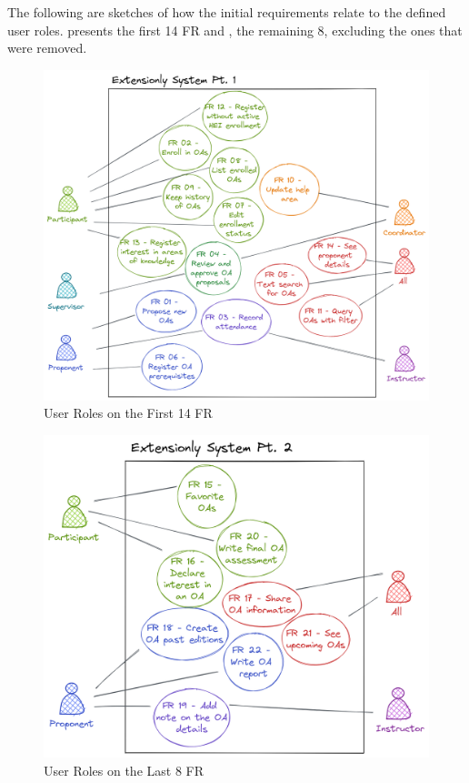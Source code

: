 

The following are sketches of how the initial requirements relate to the defined user roles.  presents the first 14 \ac{FR} and , the remaining 8, excluding the ones that were removed.

\begin{figure}[!htb]
  \caption{User Roles on the First 14 \ac{FR}}\label{fig:use-case-1}
  \begin{center}
    \includegraphics[width=15cm]{img/6-use-case-1.png}
  \end{center}
\end{figure}

\begin{figure}[!htb]
  \caption{User Roles on the Last 8 \ac{FR}}\label{fig:use-case-2}
  \begin{center}
    \includegraphics[width=12cm]{img/6-use-case-2.png}
  \end{center}
\end{figure}

